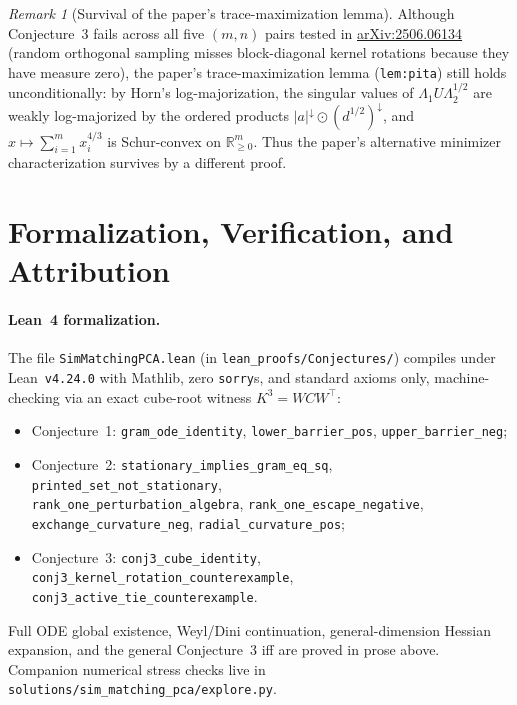 \documentclass[11pt]{article}
\theoremstyle{plain}
\theoremstyle{definition}
\theoremstyle{remark}
\newtheorem{remark}{Remark}
\begin{document}
\begin{remark}[Survival of the paper's trace-maximization lemma]
Although Conjecture~3 fails across all five $(m, n)$ pairs tested in \href{https://arxiv.org/abs/2506.06134}{arXiv:2506.06134} (random orthogonal sampling misses block-diagonal kernel rotations because they have measure zero), the paper's trace-maximization lemma (\texttt{lem:pita}) still holds unconditionally: by Horn's log-majorization, the singular values of $\Lambda_1 U \Lambda_2^{1/2}$ are weakly log-majorized by the ordered products $|a|^\downarrow \odot (d^{1/2})^\downarrow$, and $x \mapsto \sum_{i=1}^m x_i^{4/3}$ is Schur-convex on $\mathbb{R}_{\ge 0}^m$. Thus the paper's alternative minimizer characterization survives by a different proof.
\end{remark}

\section{Formalization, Verification, and Attribution}

\paragraph{Lean~4 formalization.}
The file \texttt{SimMatchingPCA.lean} (in \texttt{lean\_proofs/Conjectures/}) compiles under Lean~\texttt{v4.24.0} with Mathlib, zero \texttt{sorry}s, and standard axioms only, machine-checking via an exact cube-root witness $K^3 = WCW^\top$:
\begin{itemize}[leftmargin=2em,itemsep=1pt,topsep=3pt]
\item Conjecture~1: \texttt{gram\_ode\_identity}, \texttt{lower\_barrier\_pos}, \texttt{upper\_barrier\_neg};
\item Conjecture~2: \texttt{stationary\_implies\_gram\_eq\_sq}, \texttt{printed\_set\_not\_stationary},\\
\texttt{rank\_one\_perturbation\_algebra}, \texttt{rank\_one\_escape\_negative},\\
\texttt{exchange\_curvature\_neg}, \texttt{radial\_curvature\_pos};
\item Conjecture~3: \texttt{conj3\_cube\_identity}, \texttt{conj3\_kernel\_rotation\_counterexample},\\
\texttt{conj3\_active\_tie\_counterexample}.
\end{itemize}
Full ODE global existence, Weyl/Dini continuation, general-dimension Hessian expansion, and the general Conjecture~3 iff are proved in prose above. Companion numerical stress checks live in \texttt{solutions/sim\_matching\_pca/explore.py}.
\end{document}
